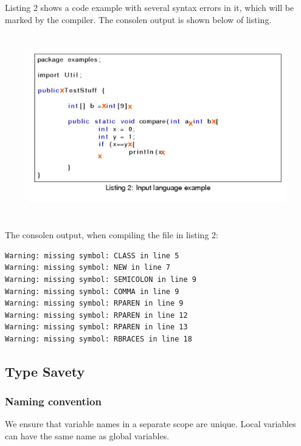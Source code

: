 Listing 2 shows a code example with several syntax errors in it, which will be marked by the compiler. The consolen output is shown below of listing.

\begin{figure}[h]
\label{synErrors}
\includegraphics[width=12.5cm,height=8cm]{images/synError.png}
\end{figure}

%
%
%
%	
%		
The consolen output, when compiling the file in listing 2:
\begin{verbatim}
Warning: missing symbol: CLASS in line 5
Warning: missing symbol: NEW in line 7
Warning: missing symbol: SEMICOLON in line 9
Warning: missing symbol: COMMA in line 9
Warning: missing symbol: RPAREN in line 9
Warning: missing symbol: RPAREN in line 12
Warning: missing symbol: RPAREN in line 13
Warning: missing symbol: RBRACES in line 18
\end{verbatim}


\subsection {Type Savety}
\label{labelTypeCheck}

\subsubsection{Naming convention}
We ensure that variable names in a separate scope are unique. Local variables can have the same name as global variables. 

